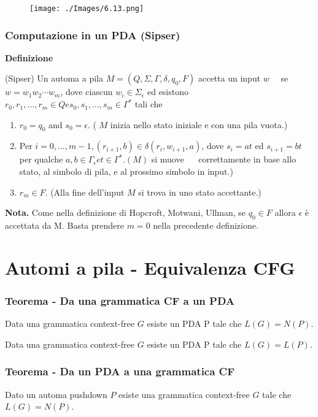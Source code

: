 \begin{figure}[hbpt!]
    \centering
    \texttt{[image: ./Images/6.13.png]}
\end{figure}
\FloatBarrier

\subsubsection{Computazione in un PDA (Sipser)}
\textbf{Definizione}

(Sipser) Un automa a pila $M=\left(Q, \Sigma, \Gamma, \delta, q_{0}, F\right)$ accetta un input
$w \quad$ se $w=w_{1} w_{2} \cdots w_{m}$, dove ciascun $w_{i} \in \Sigma_{\epsilon}$ ed esistono
$r_{0}, r_{1}, \ldots, r_{m} \in Q e s_{0}, s_{1}, \ldots, s_{m} \in \Gamma^{*}$ tali che
\begin{enumerate}
    \item $r_{0}=q_{0}$ and $s_{0}=\epsilon$. ( $M$ inizia nello stato iniziale e con una pila
vuota.)
    \item Per $i=0, \ldots, m-1,\left(r_{i+1}, b\right) \in \delta\left(r_{i}, w_{i+1}, a\right)$, dove $s_{i}=a t$ ed
$s_{i+1}=b t$ per qualche $a, b \in \Gamma_{\epsilon} e t \in \Gamma^{*} .(M)$ si muove
$\quad$ correttamente in base allo stato, al simbolo di pila, e al prossimo
simbolo in input.)
    \item  $r_{m} \in F$. (Alla fine dell'input $M$ si trova in uno stato accettante.)
\end{enumerate}
\textbf{Nota.} Come nella definizione di Hopcroft, Motwani, Ullman,
se $q_{0} \in F$ allora $\epsilon$ è accettata da M. Basta prendere $m=0$
nella precedente definizione.

\section{Automi a pila - Equivalenza CFG}

\subsubsection{Teorema - Da una grammatica CF a un PDA}

Data una grammatica context-free $G$ esiste un PDA P tale che $L(G)=N(P)$.

\vspace{5mm}

Data una grammatica context-free $G$ esiste un PDA P tale che $L(G)=L(P)$.

\subsubsection{Teorema - Da un PDA a una grammatica CF}
Dato un automa pushdown $P$ esiste una grammatica context-free $G$ tale che $L(G)=N(P)$.

